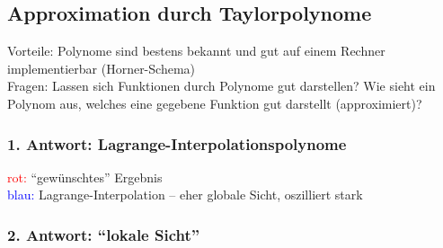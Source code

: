 
\subsection{Approximation durch Taylorpolynome}
\label{sub:Taylorpolynome}

Vorteile: Polynome sind bestens bekannt und gut auf einem Rechner implementierbar (Horner-Schema)\\
Fragen: Lassen sich Funktionen durch Polynome gut darstellen? Wie sieht ein Polynom aus, welches eine gegebene Funktion gut darstellt (approximiert)?

\subsubsection*{1. Antwort: Lagrange-Interpolationspolynome}

\begin{center}
\end{center}

\noindent\textcolor{red}{rot: }"`gewünschtes"' Ergebnis\\
\textcolor{blue}{blau: }Lagrange-Interpolation -- eher globale Sicht, oszilliert stark

\subsubsection*{2. Antwort: "`lokale Sicht"'}

